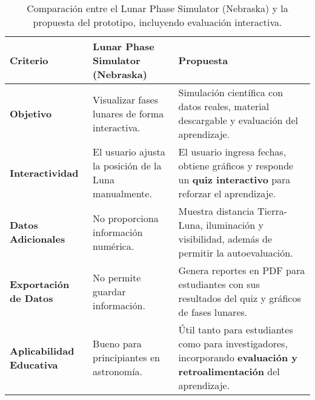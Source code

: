 \begin{table}[H]
    \centering
    \begin{tabular}{|p{4.5cm}|p{5.5cm}|p{5.5cm}|}
        \hline
        \textbf{Criterio} & \textbf{Lunar Phase Simulator (Nebraska)} & \textbf{Propuesta} \\
        \hline
        \textbf{Objetivo} & Visualizar fases lunares de forma interactiva. & Simulación científica con datos reales, material descargable y evaluación del aprendizaje. \\
        \hline
        \textbf{Interactividad} & El usuario ajusta la posición de la Luna manualmente. & El usuario ingresa fechas, obtiene gráficos y responde un \textbf{quiz interactivo} para reforzar el aprendizaje. \\
        \hline
        \textbf{Datos Adicionales} & No proporciona información numérica. & Muestra distancia Tierra-Luna, iluminación y visibilidad, además de permitir la autoevaluación. \\
        \hline
        \textbf{Exportación de Datos} & No permite guardar información. & Genera reportes en PDF para estudiantes con sus resultados del quiz y gráficos de fases lunares. \\
        \hline
        \textbf{Aplicabilidad Educativa} & Bueno para principiantes en astronomía. & Útil tanto para estudiantes como para investigadores, incorporando \textbf{evaluación y retroalimentación} del aprendizaje. \\
        \hline
    \end{tabular}
    \caption{Comparación entre el Lunar Phase Simulator (Nebraska) y la propuesta del prototipo, incluyendo evaluación interactiva.}
    \label{tab:comparacion}
\end{table}

